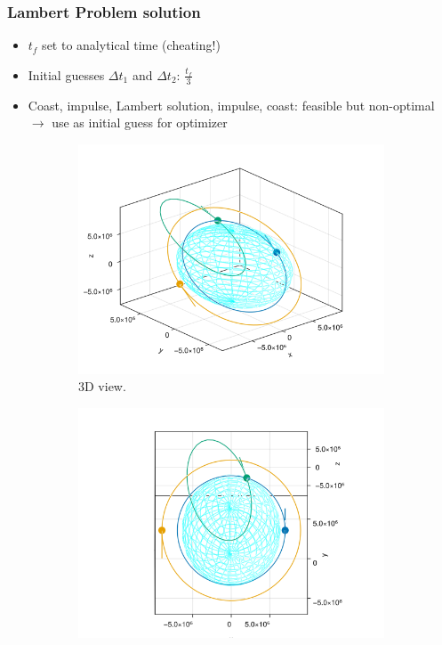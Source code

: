 \documentclass[handout]{beamer}
\begin{document}
\begin{frame}
    \frametitle{Lambert Problem solution}
    \begin{itemize}\pause
        \item \(t_f\) set to analytical time (cheating!) \pause
        \item Initial guesses \(\Delta t_1\) and \(\Delta t_2\): \(\frac{t_f}{3}\)\pause
        \item Coast, impulse, Lambert solution, impulse, coast: feasible but non-optimal \(\rightarrow\) use as initial guess for optimizer
    \end{itemize}
    
    \begin{figure}[htbp]
        \centering
        \begin{subfigure}{0.49\textwidth}
            \includegraphics[width=\textwidth]{../report/img/hohmann_lambert_guess.png}
            \caption{3D view.}
        \end{subfigure}
        \begin{subfigure}{0.49\textwidth}
            \includegraphics[width=\textwidth]{../report/img/hohmann_lambert_guess_in_plane.png}

\end{subfigure}
\end{figure}
\end{frame}
\end{document}

